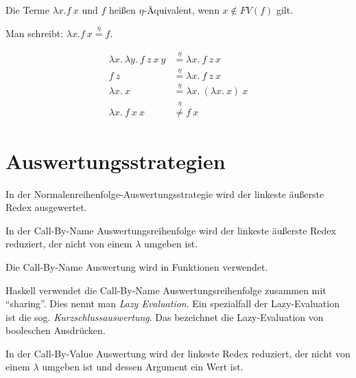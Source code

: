 \begin{definition}%
    Die Terme $\lambda x. f~x$ und $f$ heißen $\eta$-Äquivalent, wenn $x \notin FV(f)$ gilt.

    Man schreibt: $\lambda x. f~x \overset{\eta}{=} f$.
\end{definition}

\begin{beispiel}%
    \begin{align*}
        \lambda x.\ \lambda y.\ f\ z\ x\ y &\overset{\eta}{=} \lambda x.\ f\ z\ x\\
        f\ z                &\overset{\eta}{=} \lambda x.\ f\ z\ x\\
        \lambda x.\ x       &\overset{\eta}{=} \lambda x.\ (\lambda x.\ x)\ x\\
        \lambda x.\ f\ x\ x &\overset{\eta}{\neq} f\ x
    \end{align*}
\end{beispiel}

\section{Auswertungsstrategien}
\begin{definition}[Normalenreihenfolge]%
    In der Normalenreihenfolge-Auswertungsstrategie wird der linkeste äußerste
    Redex ausgewertet.
\end{definition}

\begin{definition}%
    In der Call-By-Name Auswertungsreihenfolge wird der linkeste äußerste Redex
    reduziert, der nicht von einem $\lambda$ umgeben ist.
\end{definition}

Die Call-By-Name Auswertung wird in Funktionen verwendet.

Haskell verwendet die Call-By-Name Auswertungsreihenfolge zusammen mit \enquote{sharing}. Dies nennt man \textit{Lazy Evaluation}. Ein spezialfall der Lazy-Evaluation ist die sog. \textit{Kurzschlussauswertung}.
Das bezeichnet die Lazy-Evaluation von booleschen Ausdrücken.


\begin{definition}%
    In der Call-By-Value Auswertung wird der linkeste Redex reduziert, der
    nicht von einem $\lambda$ umgeben ist und dessen Argument ein Wert ist.
\end{definition}

